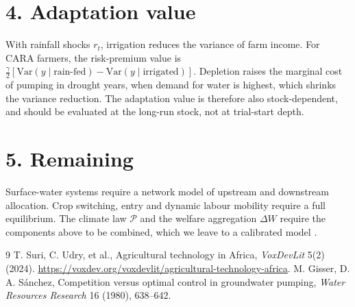 \documentclass[11pt]{article}
\theoremstyle{definition}
\begin{document}
\section*{4. Adaptation value}
With rainfall shocks $r_t$, irrigation reduces the variance of farm income. For CARA farmers, the risk-premium value is
$\tfrac\gamma2[\mathrm{Var}(y\mid\text{rain-fed})-\mathrm{Var}(y\mid\text{irrigated})]$. Depletion raises the marginal cost
of pumping in drought years, when demand for water is highest, which shrinks the variance reduction. The adaptation value is
therefore also stock-dependent, and should be evaluated at the long-run stock, not at trial-start depth.

\section*{5. Remaining}
Surface-water systems require a network model of upstream and downstream allocation. Crop switching, entry and dynamic labour
mobility require a full equilibrium. The climate law $\mathcal P$ and the welfare aggregation $\Delta W$ require the
components above to be combined, which we leave to a calibrated model \cite{suri}.

\begin{thebibliography}{9}
 T. Suri, C. Udry, et al., Agricultural technology in Africa, \emph{VoxDevLit} 5(2) (2024). \url{https://voxdev.org/voxdevlit/agricultural-technology-africa}.
 M. Gisser, D. A. S\'anchez, Competition versus optimal control in groundwater pumping, \emph{Water Resources Research} 16 (1980), 638--642.
\end{thebibliography}
\end{document}
